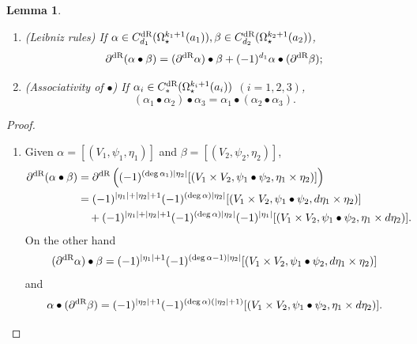 \documentclass[10pt]{amsart}
\numberwithin{equation}{section}
\theoremstyle{plain}
\newtheorem{lemma}[theorem]{Lemma}
\theoremstyle{definition}
\theoremstyle{remark}
\numberwithin{equation}{section}
\newcommand{\dR}{\textup{dR}}
\begin{document}
{\begin{lemma}\label{Lm: dRchainBulletProdApp}
	\begin{enumerate}
		\item (Leibniz rules) If $\alpha\in C^\dR_{d_1}(\Omega^{k_1+1}_\star (a_1)), \beta \in C^\dR_{d_2}(\Omega_\star^{k_2+1}(a_2))$, \[\partial^\dR( \alpha\bullet \beta )= (\partial^\dR \alpha)\bullet \beta + (-1)^{d_1}\alpha \bullet (\partial^\dR \beta);\]
		\item (Associativity of $\bullet$) If $\alpha_i\in C^\dR_*(\Omega_\star^{k_i+1}(a_i))$ $(i=1,2,3)$, \[ (\alpha_1 \bullet \alpha_2)\bullet \alpha_3 = \alpha_1\bullet (\alpha_2\bullet \alpha_3).\]
		\end{enumerate}
\end{lemma}
\begin{proof}
	\begin{enumerate}
		\item Given $\alpha = [(V_1,\psi_1,\eta_1)]$ and $\beta=[(V_2,\psi_2,\eta_2)]$, 
		\begin{align*}
			\partial^\dR(\alpha\bullet \beta)&= \partial^\dR \left((-1)^{(\deg \alpha_1) |\eta_2|} [( V_1\times V_2, \psi_1 \bullet \psi_2 , \eta_1\times \eta_2 )]\right)\\
			&= (-1)^{|\eta_1|+|\eta_2|+1}(-1)^{(\deg \alpha)|\eta_2|}[(V_1\times V_2, \psi_1 \bullet \psi_2, d\eta_1\times \eta_2)] \\
				&\quad + (-1)^{|\eta_1|+|\eta_2|+1}(-1)^{(\deg \alpha) |\eta_2|}(-1)^{|\eta_1|}[(V_1\times V_2, \psi_1 \bullet \psi_2, \eta_1\times d\eta _2)].
		\end{align*} 
		On the other hand
		\begin{align*}
			(\partial^\dR \alpha)\bullet \beta 
			= (-1)^{|\eta_1|+1}(-1)^{(\deg \alpha - 1)|\eta_2|}[(V_1\times V_2, \psi_1 \bullet \psi_2, d\eta_1 \times \eta_2)]
		\end{align*}
		and 
		\begin{align*}
			 \alpha \bullet (\partial^\dR \beta) 
			= (-1)^{|\eta_2|+1} (-1)^{ (\deg \alpha)(|\eta_2|+1) }[(V_1\times V_2 , \psi_1 \bullet \psi_2, \eta_1\times d\eta_2)].
		\end{align*}
		


\end{enumerate}
\end{proof}}
\end{document}

